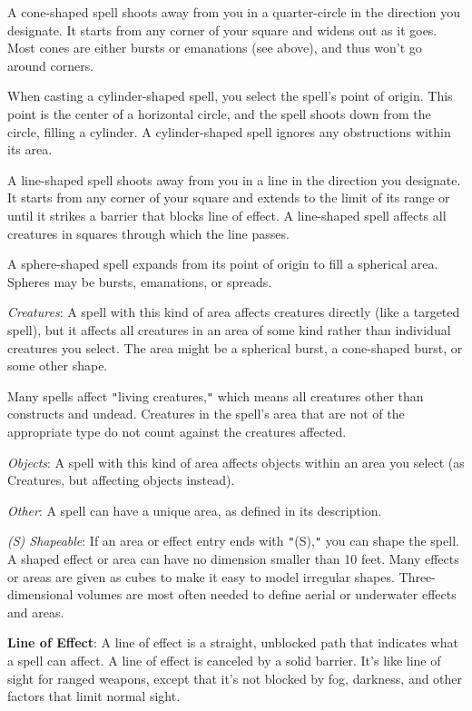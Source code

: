 A cone-shaped spell shoots away from you in a quarter-circle in the direction you designate. It starts from any corner of your square and widens out as it goes. Most cones are either bursts or emanations (see above), and thus won't go around corners.
				
When casting a cylinder-shaped spell, you select the spell's point of origin. This point is the center of a horizontal circle, and the spell shoots down from the circle, filling a cylinder. A cylinder-shaped spell ignores any obstructions within its area.
				
A line-shaped spell shoots away from you in a line in the direction you designate. It starts from any corner of your square and extends to the limit of its range or until it strikes a barrier that blocks line of effect. A line-shaped spell affects all creatures in squares through which the line passes.
				
A sphere-shaped spell expands from its point of origin to fill a spherical area. Spheres may be bursts, emanations, or spreads.
				
\textit{Creatures}: A spell with this kind of area affects creatures directly (like a targeted spell), but it affects all creatures in an area of some kind rather than individual creatures you select. The area might be a spherical burst, a cone-shaped burst, or some other shape.
				
Many spells affect \texttt{{}"{}}living creatures,\texttt{{}"{}} which means all creatures other than constructs and undead. Creatures in the spell's area that are not of the appropriate type do not count against the creatures affected.
				
\textit{Objects}: A spell with this kind of area affects objects within an area you select (as Creatures, but affecting objects instead).
				
\textit{Other}: A spell can have a unique area, as defined in its description.
				
\textit{(S) Shapeable}: If an area or effect entry ends with \texttt{{}"{}}(S),\texttt{{}"{}} you can shape the spell. A shaped effect or area can have no dimension smaller than 10 feet. Many effects or areas are given as cubes to make it easy to model irregular shapes. Three-dimensional volumes are most often needed to define aerial or underwater effects and areas.
				
\textbf{Line of Effect}: A line of effect is a straight, unblocked path that indicates what a spell can affect. A line of effect is canceled by a solid barrier. It's like line of sight for ranged weapons, except that it's not blocked by fog, darkness, and other factors that limit normal sight.
				
